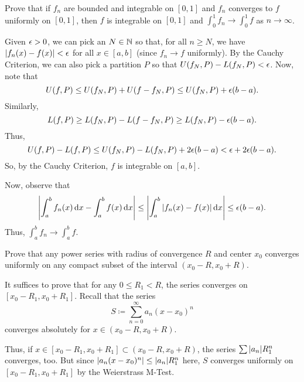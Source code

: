 \documentclass{article}
\begin{document}
\begin{problem}
Prove that if $f_n$ are bounded and integrable on $[0, 1]$ and $f_n$ converges to $f$ uniformly on $[0, 1]$, then $f$ is integrable on $[0, 1]$ and $\int_0^1 f_n \to \int_0^1 f$ as $n \to \infty$.
\begin{solution}
	Given $\epsilon > 0$, we can pick an $N \in \mathbb{N}$ so that, for all $n \ge N$, we have $\abs{f_n(x) - f(x)} < \epsilon$ for all $x \in [a, b]$ (since $f_n \to f$ uniformly).
	By the Cauchy Criterion, we can also pick a partition $P$ so that $U(f_N, P) - L(f_N, P) < \epsilon$.
	Now, note that
	\[
		U(f, P) \le U(f_N, P) + U(f - f_N, P) \le U(f_N, P) + \epsilon(b - a).
	\]
	Similarly,
	\[
		L(f, P) \ge L(f_N, P) - L(f - f_N, P) \ge L(f_N, P) - \epsilon(b - a).
	\]
	Thus,
	\[
		U(f, P) - L(f, P) \le U(f_N, P) - L(f_N, P) + 2\epsilon(b - a) < \epsilon + 2\epsilon(b - a).
	\]
	So, by the Cauchy Criterion, $f$ is integrable on $[a, b]$.

	Now, observe that
	\[
		\abs{\int_a^b f_n(x) \dd{x} - \int_a^b f(x) \dd{x}} \le \abs{\int_a^b \abs{f_n(x) - f(x)} \dd{x}} \le \epsilon(b - a).
	\]
	Thus, $\int_a^b f_n \to \int_a^b f$.
\end{solution}
\end{problem}

\begin{problem}
Prove that any power series with radius of convergence $R$ and center $x_0$ converges uniformly on any compact subset of the interval $(x_0 - R, x_0 + R)$.
\begin{solution}
	It suffices to prove that for any $0 \le R_1 < R$, the series converges on $[x_0 - R_1, x_0 + R_1]$.
	Recall that the series
	\[
		S \coloneq \sum_{n = 0}^\infty a_n (x - x_0)^n
	\]
	converges absolutely for $x \in (x_0 - R, x_0 + R)$.

	Thus, if $x \in [x_0 - R_1, x_0 + R_1] \subset (x_0 - R, x_0 + R)$, the series $\sum \abs{a_n} R_1^n$ converges, too.
	But since $\abs{a_n(x - x_0)^n} \le \abs{a_n} R_1^n$ here, $S$ converges uniformly on $[x_0 - R_1, x_0 + R_1]$ by the Weierstrass M-Test.
\end{solution}
\end{problem}
\end{document}
